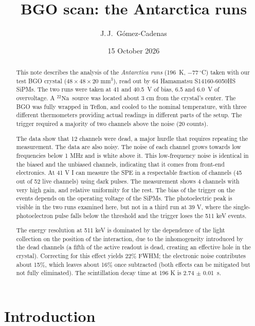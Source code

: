 \documentclass[11pt]{article}
\title{BGO scan: the Antarctica runs}
\author{J.\,J.~Gómez-Cadenas}
\date{15 October 2026}
\newcommand{\us}{\textmu s\xspace}
\newcommand{\Na}{\ensuremath{{}^{22}\mathrm{Na}}\xspace}
\begin{document}
\maketitle

\begin{abstract}
This note describes the analysis of the \emph{Antarctica runs} (196~K,
$-77\,^\circ$C) taken with our test BGO crystal ($48 \times 48 \times 20$ mm$^3$),  read out by 
64 Hamamatsu S14160-6050HS SiPMs. The two runs were taken at 41 and 40.5~V of bias, 6.5 and 6.0~V of overvoltage.
A \Na\ source was located about 3 cm from the crystal's center. The BGO was fully wrapped in Teflon, and
cooled to the nominal temperature, with three different thermometers providing actual readings in different parts of the setup. The trigger required a majority of two channels above the noise (20 counts).

The data show that 12 channels were dead, a major hurdle that requires repeating the measurement. The data are also noisy. The noise of each channel grows towards low frequencies below 1 MHz and is white above it. This low-frequency noise is identical in the biased and the unbiased channels, indicating that it comes from front-end electronics. At 41 V I can measure the SPE in a respectable fraction of channels (45 out of 52 live channels) using dark pulses. The measurement shows 4 channels with very high gain, and relative uniformity for the rest. The bias of the trigger on the events depends on the operating voltage of the SiPMs. The photoelectric peak is visible in the two runs examined here, but not in a third run at 39 V, where the single-photoelectron pulse falls below the threshold and the trigger loses the 511 keV events.

The energy resolution at 511 keV is dominated by the dependence of the light collection on the position of the interaction, due to the inhomogeneity introduced by the dead channels (a fifth of the active readout is dead, creating an effective hole in the crystal). Correcting for this effect yields 22\% FWHM; the electronic noise contributes about 15\%, which leaves about 16\% once subtracted (both effects can be mitigated but not fully eliminated). The scintillation decay time at 196 K is 2.74 $\pm$ 0.01~\us.
\end{abstract}

\section{Introduction}
\end{document}
